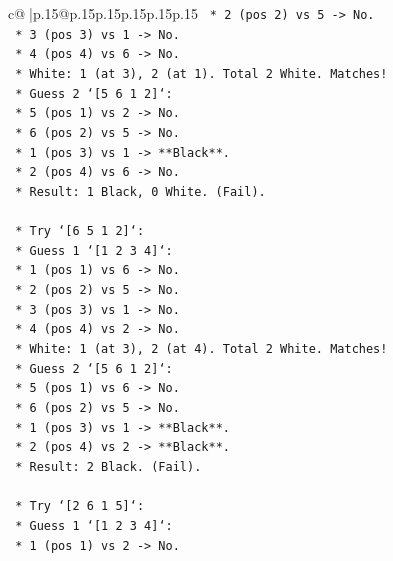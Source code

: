 \documentclass{article}
\begin{document}
{\begin{supertabular}{c@{$\;$}|p{.15\linewidth}@{}p{.15\linewidth}p{.15\linewidth}p{.15\linewidth}p{.15\linewidth}p{.15\linewidth}}
{{{\texttt{                    *   2 (pos 2) vs 5 {-}> No.} \\
\texttt{                    *   3 (pos 3) vs 1 {-}> No.} \\
\texttt{                    *   4 (pos 4) vs 6 {-}> No.} \\
\texttt{                    *   White: 1 (at 3), 2 (at 1). Total 2 White. Matches!} \\
\texttt{                *   Guess 2 `{[}5 6 1 2{]}`:} \\
\texttt{                    *   5 (pos 1) vs 2 {-}> No.} \\
\texttt{                    *   6 (pos 2) vs 5 {-}> No.} \\
\texttt{                    *   1 (pos 3) vs 1 {-}> **Black**.} \\
\texttt{                    *   2 (pos 4) vs 6 {-}> No.} \\
\texttt{                    *   Result: 1 Black, 0 White. (Fail).} \\
\\ 
\texttt{    *   Try `{[}6 5 1 2{]}`:} \\
\texttt{        *   Guess 1 `{[}1 2 3 4{]}`:} \\
\texttt{            *   1 (pos 1) vs 6 {-}> No.} \\
\texttt{            *   2 (pos 2) vs 5 {-}> No.} \\
\texttt{            *   3 (pos 3) vs 1 {-}> No.} \\
\texttt{            *   4 (pos 4) vs 2 {-}> No.} \\
\texttt{            *   White: 1 (at 3), 2 (at 4). Total 2 White. Matches!} \\
\texttt{        *   Guess 2 `{[}5 6 1 2{]}`:} \\
\texttt{            *   5 (pos 1) vs 6 {-}> No.} \\
\texttt{            *   6 (pos 2) vs 5 {-}> No.} \\
\texttt{            *   1 (pos 3) vs 1 {-}> **Black**.} \\
\texttt{            *   2 (pos 4) vs 2 {-}> **Black**.} \\
\texttt{            *   Result: 2 Black. (Fail).} \\
\\ 
\texttt{    *   Try `{[}2 6 1 5{]}`:} \\
\texttt{        *   Guess 1 `{[}1 2 3 4{]}`:} \\
\texttt{            *   1 (pos 1) vs 2 {-}> No.} \\
}}}
\end{supertabular}}
\end{document}
